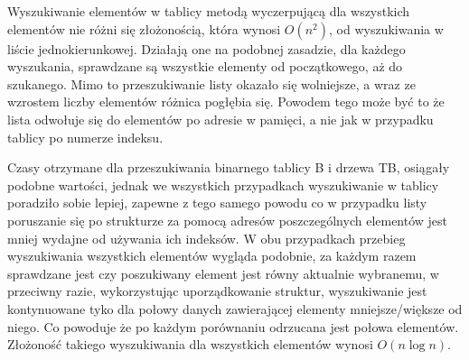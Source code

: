 \documentclass[polish,polish,a4paper]{article}
\begin{document}
Wyszukiwanie elementów w tablicy metodą wyczerpującą dla wszystkich elementów nie różni się złożonością, która wynosi $O(n^2)$,  od wyszukiwania w liście jednokierunkowej. Działają one na podobnej zasadzie, dla każdego wyszukania, sprawdzane są wszystkie elementy od początkowego, aż do szukanego. Mimo to przeszukiwanie listy okazało się wolniejsze, a wraz ze wzrostem liczby elementów różnica pogłębia się.  Powodem tego może być to że lista odwołuje się do elementów po adresie w pamięci, a nie jak w przypadku tablicy po numerze indeksu.

Czasy otrzymane dla przeszukiwania binarnego tablicy B i drzewa TB, osiągały podobne wartości, jednak we wszystkich przypadkach wyszukiwanie w tablicy poradziło sobie lepiej, zapewne z tego samego powodu co w przypadku listy poruszanie się po strukturze za pomocą adresów poszczególnych elementów jest mniej wydajne od używania ich indeksów. W obu przypadkach przebieg wyszukiwania wszystkich elementów wygląda podobnie, za każdym razem sprawdzane jest czy poszukiwany element jest równy aktualnie wybranemu, w przeciwny razie, wykorzystując uporządkowanie struktur, wyszukiwanie jest kontynuowane tyko dla połowy danych zawierającej elementy mniejsze/większe od niego. Co powoduje że po każdym porównaniu odrzucana jest połowa elementów. Złożoność takiego wyszukiwania dla wszystkich elementów wynosi $O(n\log n)$.
\end{document}
